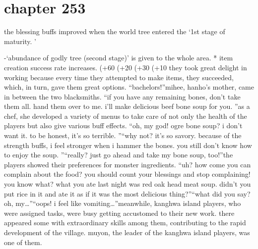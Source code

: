 \section{chapter 253}

                            the blessing buffs improved when the world tree entered the ‘1st stage of maturity.
’




-‘abundance of godly tree (second stage)’ is given to the whole area.
* item creation success rate increases.
 (+60%
 (+20%
 (+30%
 (+10%
 they took great delight in working because every time they attempted to make items, they succeeded, which, in turn, gave them great options.
“bachelors!”mihee, hanho’s mother, came in between the two blacksmiths.
“if you have any remaining bones, don’t take them all.
 hand them over to me.
 i’ll make delicious beef bone soup for you.
”as a chef, she developed a variety of menus to take care of not only the health of the players but also give various buff effects.
“oh, my god! ogre bone soup? i don’t want it.
 to be honest, it’s so terrible.
”“why not? it’s so savory.
 because of the strength buffs, i feel stronger when i hammer the bones.
 you still don’t know how to enjoy the soup.
”“really? just go ahead and take my bone soup, too!”the players showed their preferences for monster ingredients.
“uh? how come you can complain about the food? you should count your blessings and stop complaining! you know what? what you ate last night was red oak head meat soup.
 didn’t you put rice in it and ate it as if it was the most delicious thing?”“what did you say? oh, my…”“oops! i feel like vomiting…”meanwhile, kanghwa island players, who were assigned tasks, were busy getting accustomed to their new work.
there appeared some with extraordinary skills among them, contributing to the rapid development of the village.
 muyon, the leader of the kanghwa island players, was one of them.

